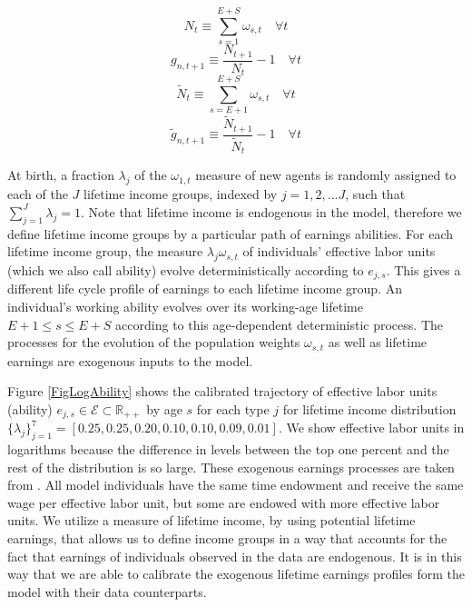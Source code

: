 \documentclass[letterpaper,12pt]{article}
\theoremstyle{definition}
\begin{document}
\begin{spacing}{1.5}
    \begin{equation}\label{EqPopDef}
      N_t\equiv\sum_{s=1}^{E+S} \omega_{s,t} \quad\forall t
    \end{equation}
    \begin{equation}\label{EqPopGrowth}
      g_{n,t+1} \equiv \frac{N_{t+1}}{N_t} - 1 \quad\forall t
    \end{equation}
    \begin{equation}\label{EqPopWkDef}
      \tilde{N}_t\equiv\sum_{s=E+1}^{E+S} \omega_{s,t} \quad\forall t
    \end{equation}
    \begin{equation}\label{EqPopWkGrowth}
      \tilde{g}_{n,t+1} \equiv \frac{\tilde{N}_{t+1}}{\tilde{N}_t} - 1 \quad\forall t
    \end{equation}

    At birth, a fraction $\lambda_j$ of the $\omega_{1,t}$ measure of new agents is randomly assigned to each of the $J$ lifetime income groups, indexed by $j=1,2,...J$, such that $\sum_{j=1}^J\lambda_j=1$. Note that lifetime income is endogenous in the model, therefore we define lifetime income groups by a particular path of earnings abilities. For each lifetime income group, the measure $\lambda_j\omega_{s,t}$ of individuals' effective labor units (which we also call ability) evolve deterministically according to $e_{j,s}$. This gives a different life cycle profile of earnings to each lifetime income group.  An individual's working ability evolves over its working-age lifetime $E+1\leq s \leq E+S$ according to this age-dependent deterministic process. The processes for the evolution of the population weights $\omega_{s,t}$ as well as lifetime earnings are exogenous inputs to the model.

    Figure \ref{FigLogAbility} shows the calibrated trajectory of effective labor units (ability) $e_{j,s}\in\mathcal{E}\subset\mathbb{R}_{++}$ by age $s$ for each type $j$ for lifetime income distribution $\{\lambda_j\}_{j=1}^7 = [0.25,0.25,0.20,0.10,0.10,0.09,0.01]$. We show effective labor units in logarithms because the difference in levels between the top one percent and the rest of the distribution is so large. These exogenous earnings processes are taken from \citet{DEMPRW2015}.  All model individuals have the same time endowment and receive the same wage per effective labor unit, but some are endowed with more effective labor units. We utilize a measure of lifetime income, by using potential lifetime earnings, that allows us to define income groups in a way that accounts for the fact that earnings of individuals observed in the data are endogenous.  It is in this way that we are able to calibrate the exogenous lifetime earnings profiles form the model with their data counterparts.


\end{spacing}
\end{document}
